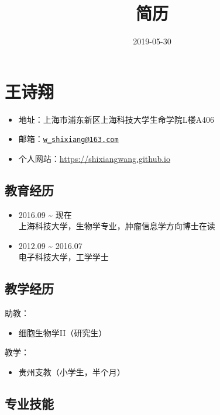 \documentclass[10pt,]{article}
\title{简历}
\date{2019-05-30}
\providecommand{\tightlist}{%
  \setlength{\itemsep}{0pt}\setlength{\parskip}{0pt}}
\begin{document}

\section{王诗翔}

\begin{itemize}
\tightlist
\item
  地址：上海市浦东新区上海科技大学生命学院L楼A406
\item
  邮箱：\href{mailto:w_shixiang@163.com}{\nolinkurl{w\_shixiang@163.com}}
\item
  个人网站：\url{https://shixiangwang.github.io}
\end{itemize}

\subsection{教育经历}

\begin{itemize}
\item
  2016.09 \textasciitilde{} 现在 \\
  上海科技大学，生物学专业，肿瘤信息学方向博士在读
\item
  2012.09 \textasciitilde{} 2016.07 \\
  电子科技大学，工学学士
\end{itemize}

\subsection{教学经历}

助教：

\begin{itemize}
\tightlist
\item
  细胞生物学II（研究生）
\end{itemize}

教学：

\begin{itemize}
\tightlist
\item
  贵州支教（小学生，半个月）
\end{itemize}

\subsection{专业技能}
\end{document}
